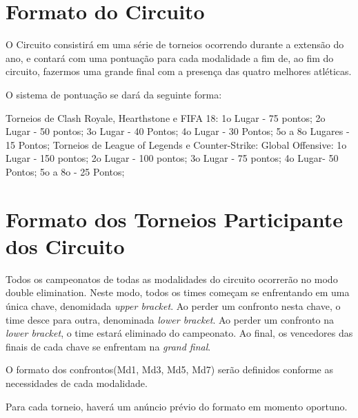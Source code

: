 \section{Formato do Circuito}

O Circuito consistirá em uma série de torneios ocorrendo durante a extensão do ano, e contará com uma pontuação para cada modalidade a fim de, ao fim do circuito, fazermos uma grande final com a presença das quatro melhores atléticas.

O sistema de pontuação se dará da seguinte forma:

Torneios de Clash Royale, Hearthstone e FIFA 18: 1o Lugar - 75 pontos; 2o Lugar - 50 pontos; 3o Lugar - 40 Pontos; 4o Lugar - 30 Pontos; 5o a 8o Lugares - 15 Pontos;
Torneios de League of Legends e Counter-Strike: Global Offensive: 1o Lugar - 150 pontos; 2o Lugar - 100 pontos; 3o Lugar - 75 pontos; 4o Lugar- 50 Pontos; 5o a 8o - 25 Pontos;


\section{Formato dos Torneios Participante dos Circuito}

Todos os campeonatos de todas as modalidades do circuito ocorrerão no modo double elimination. Neste modo, todos os times começam se enfrentando em uma única chave, denomidada \textit{upper bracket}. Ao perder um confronto nesta chave, o time desce para outra, denominada \textit{lower bracket}. Ao perder um confronto na \textit{lower bracket}, o time estará eliminado do campeonato. Ao final, os vencedores das finais de cada chave se enfrentam na \textit{grand final}.

O formato dos confrontos(Md1, Md3, Md5, Md7) serão definidos conforme as necessidades de cada modalidade.

Para cada torneio, haverá um anúncio prévio do formato em momento oportuno.




